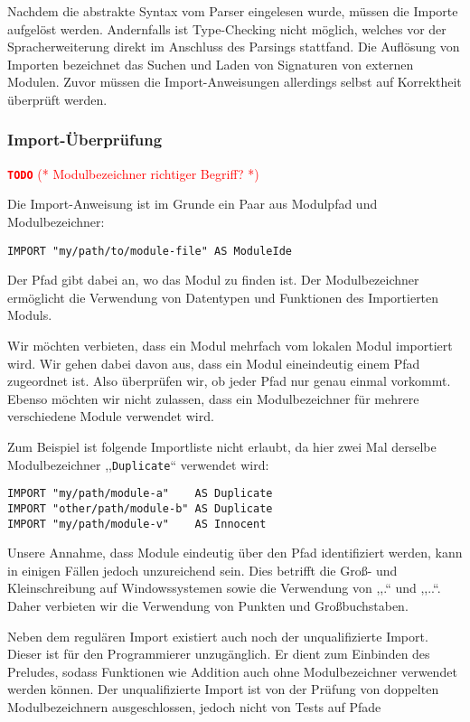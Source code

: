 \documentclass[runningheads]{llncs}
\newcommand{\TODO}[1]{ \textcolor{red}{\textbf{\texttt{\large{TODO}}} (* #1 *)}\par}
\begin{document}
Nachdem die abstrakte Syntax vom Parser eingelesen wurde, müssen die Importe aufgelöst werden. Andernfalls ist Type-Checking nicht möglich, welches vor der Spracherweiterung direkt im Anschluss des Parsings stattfand. Die Auflösung von Importen bezeichnet das Suchen und Laden von Signaturen von externen Modulen. Zuvor müssen die Import-Anweisungen allerdings selbst auf Korrektheit überprüft werden.

\subsubsection{Import-Überprüfung}

\TODO{Modulbezeichner richtiger Begriff?}

Die Import-Anweisung ist im Grunde ein Paar aus Modulpfad und Modulbezeichner:

\begin{verbatim}
IMPORT "my/path/to/module-file" AS ModuleIde
\end{verbatim}

Der Pfad gibt dabei an, wo das Modul zu finden ist. Der Modulbezeichner ermöglicht die Verwendung von Datentypen und Funktionen des Importierten Moduls.

Wir möchten verbieten, dass ein Modul mehrfach vom lokalen Modul importiert wird. Wir gehen dabei davon aus, dass ein Modul eineindeutig einem Pfad zugeordnet ist. Also überprüfen wir, ob jeder Pfad nur genau einmal vorkommt. Ebenso möchten wir nicht zulassen, dass ein Modulbezeichner für mehrere verschiedene Module verwendet wird.

Zum Beispiel ist folgende Importliste nicht erlaubt, da hier zwei Mal derselbe Modulbezeichner ,,\verb|Duplicate|`` verwendet wird:

\begin{verbatim}
IMPORT "my/path/module-a"    AS Duplicate
IMPORT "other/path/module-b" AS Duplicate
IMPORT "my/path/module-v"    AS Innocent
\end{verbatim}

Unsere Annahme, dass Module eindeutig über den Pfad identifiziert werden, kann in einigen Fällen jedoch unzureichend sein. Dies betrifft die Groß- und Kleinschreibung auf Windowssystemen sowie die Verwendung von ,,.`` und ,,..``. Daher verbieten wir die Verwendung von Punkten und Großbuchstaben.

Neben dem regulären Import existiert auch noch der unqualifizierte Import. Dieser ist für den Programmierer unzugänglich. Er dient zum Einbinden des Preludes, sodass Funktionen wie Addition auch ohne Modulbezeichner verwendet werden können. Der unqualifizierte Import ist von der Prüfung von doppelten Modulbezeichnern ausgeschlossen, jedoch nicht von Tests auf Pfade
\end{document}
